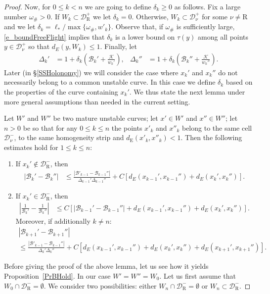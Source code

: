 \documentclass[AHL, Unicode, longabstracts,published]{cedram}
\newcommand{\cB}{\mathcal{B}}
\newcommand{\cK}{\mathcal{K}}
\newcommand{\cell}{\mathcal{D}}
\newcommand{\privatel}[1]{#1_*}
\newcommand{\elll}{\privatel{\ell}}
\newcommand{\recoPrivate}{\mathrm{R}}
\newcommand{\reco}{{\cell^-_{\recoPrivate}}}
\newcommand{\backReco}{{\cell^+_{\recoPrivate}}}
\newcommand{\eum}{_\text{E}}
\newcommand{\law}[1]{\omega_{#1}}
\newcommand{\lawc}{\law{\#}}
\newcommand{\indCell}{\nu}
\newcommand*{\relabel}{\renewcommand{\labelenumi}{(\theenumi)}}
\newcommand*{\alphenumi}{\renewcommand*{\theenumi}{\alph{enumi}}\relabel}
\begin{document}
\begin{proof}
Now, for $0\le k < n$ we are going to define $\delta_{k}\ge0$ as follows. Fix a large number $\lawc > 0$. If $W_{k}\subset \backReco$ we let $\delta_{k}=0$. Otherwise, $W_{k}\subset\cell_{\indCell}^{+}$ for some $\indCell\ne\text{R}$ and we let $\delta_{k} = \elll/\max\{\lawc,w'_{k}\}$. Observe that, if $\lawc$ is sufficiently large, \eqref{e_boundFreeFlight} implies that $\delta_{k}$ is a lower bound on $\tau(y)$ among all points $y\in\cell_{\indCell}^{+}$ so that $d_{E}(y,W_{k})\le 1$. Finally, let
\begin{align*}
\Delta_k' &=1+\delta_{k} \left(\cB_{k}'+\frac{\cK}{w_k'}\right),&
\Delta_k''&=1+\delta_{k} \left(\cB_{k}''+\frac{\cK}{w_k''}\right).
\end{align*}
Later (in \S\ref{SSHolonomy}) we will consider the case where $x_k'$ and $x_k''$ do not necessarily belong to a common unstable curve. In this case we define $\delta_{k}$ based on the properties of the curve containing $x_{k}'$. We thus state the next lemma under more general assumptions than needed in the current setting.
\begin{lemm} \label{LmB1-2step}
Let $W'$ and $W''$ be two mature unstable curves; let $x'\in W'$ and $x''\in W''$; let $n > 0$ be so that for any $0\le k\le n$ the points $x'_k$ and $x''_k$ belong to the same cell $\cell_{\indCell}^{-}$, to the same homogeneity strip and $d\eum(x'_{k}, x''_{k}) < 1$. Then the following estimates hold for $1 \le k\le n$:
\begin{enumerate}\alphenumi
\item\label{lemm5.3.1} If $x_k'\not\in\reco$, then
\begin{align*}
\left| \cB_k'-\cB_k''\right| &\le\frac{\left|\cB'_{k-1}-\cB_{k-1}''\right|}{\Delta_{k-1}' \Delta_{k-1}''}+ C
\left[d_E\left(x_{k-1}', x_{k-1}''\right)+d_E\left(x_{k}', x_{k}''\right)\right].
\end{align*}
\item\label{lemm5.3.2} If $x_k'\in\reco$, then
\begin{align}\label{B2Lip}
\left|\frac1{\cB_k'}-\frac1{\cB_k''}\right|&\leq C
\left[\left|\cB_{k-1}'-\cB_{k-1}''\right|+d_E\left(x_{k-1}', x_{k-1}''\right)+d_E(x_{k}', x_{k}'')\right].
\end{align}
Moreover, if additionally $k \ne n$:
\begin{multline*}
\left| \cB_{k+1}'-\cB_{k+1}''\right| \\
\le\frac{\left|\cB'_{k-1}-\cB_{k-1}''\right|}{\Delta_{k}' \Delta_{k}''}
 + C
\left[d_E\left(x_{k-1}', x_{k-1}''\right) + d_E\left(x_{k}', x_{k}''\right) + d_E\left(x_{k+1}', x_{k+1}''\right) \right].
\end{multline*}
\end{enumerate}
\end{lemm} Before giving the proof of the above lemma, let us see how it yields Proposition~\ref{PrBHold}. In our case $W' = W'' = W_0$. Let us first assume that $W_{0}\cap\reco = \emptyset$. We consider two possibilities: either $W_{n}\cap\reco = \emptyset$ or $W_{n}\subset\reco$.


\end{proof}
\end{document}
